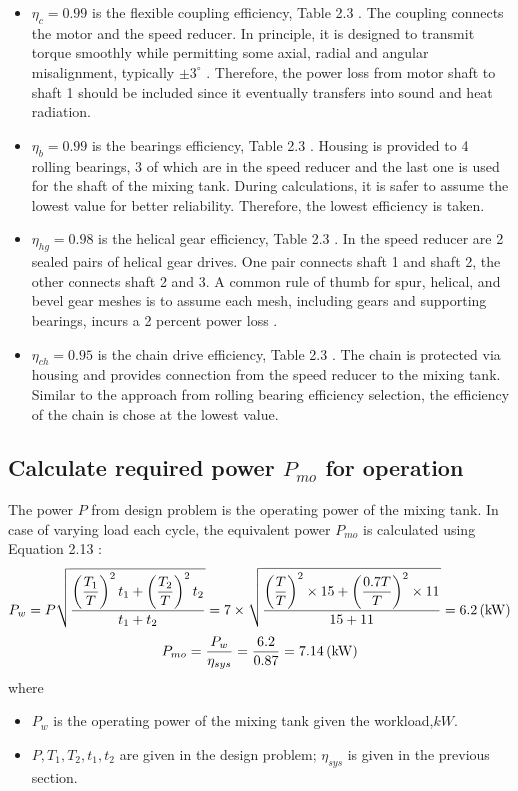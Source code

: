\begin{itemize}
	\item $ \eta_c = 0.99 $ is the flexible coupling efficiency, Table 2.3 \cite{tk1}. The  coupling connects the motor and the speed reducer. In principle, it is designed to transmit torque smoothly while permitting some axial, radial and angular misalignment, typically $ \pm 3^\circ $ \cite{mott_vavrek_wang_2018}. Therefore, the power loss from motor shaft to shaft 1 should be included since it eventually transfers into sound and heat radiation.
	\item $ \eta_b = 0.99 $ is the bearings efficiency, Table 2.3 \cite{tk1}. Housing is provided to 4 rolling bearings, 3 of which are in the speed reducer and the last one is used for the shaft of the mixing tank. During calculations, it is safer to assume the lowest  value for better reliability. Therefore, the lowest efficiency is taken.
	\item $ \eta_{hg} = 0.98 $ is the helical gear efficiency, Table 2.3 \cite{tk1}. In the speed reducer are 2 sealed pairs of helical gear drives. One pair connects shaft 1 and shaft 2, the other connects shaft 2 and 3. A common rule of thumb for spur, helical, and bevel gear meshes is to assume each mesh, including gears and supporting bearings, incurs a 2 percent power loss \cite{collins_busby_staab_2010}.
	\item $ \eta_{ch} = 0.95 $ is the chain drive efficiency, Table 2.3 \cite{tk1}. The chain is protected via housing and provides connection from  the speed reducer to the mixing tank. Similar to the approach from rolling bearing efficiency selection, the efficiency of the chain is chose at the lowest value.
\end{itemize}
\subsection{Calculate required power $ P_{mo} $ for operation} The power $ P $ from design problem is the operating power of the mixing tank. In case of varying load each cycle, the equivalent power $ P_{mo} $ is calculated using  Equation 2.13 \cite{tk1}:
\[P_w = P\sqrt{\dfrac{\left(\dfrac{T_1}{T}\right)^2t_1 + \left(\dfrac{T_2}{T}\right)^2t_2}{t_1+t_2}} = 7 \times \sqrt{\dfrac{\left(\dfrac{T}{T}\right)^2\times15 + \left(\dfrac{0.7T}{T}\right)^2\times11}{15+11}} = 6.2 \, (\mathrm{kW})\]
\[P_{mo} = \dfrac{P_w}{\eta_{sys}} = \dfrac{6.2}{0.87} = 7.14 \, (\mathrm{kW})\]
where
\begin{itemize}
	\item $ P_w $ is the operating power of the mixing tank given the workload,$ \unit{kW} $.
	\item $ P,T_1,T_2,t_1,t_2$ are given in the design problem; $ \eta_{sys} $ is given in the previous section.
\end{itemize}



